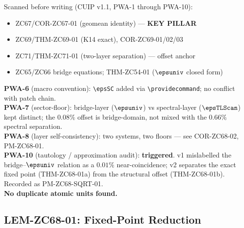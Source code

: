 \documentclass[12pt, a4paper]{article}
\begin{document}
\begin{formalbox}[title={Pre-Work Audit Record --- ZC68 v2}]
Scanned before writing (CUIP v1.1, PWA-1 through PWA-10):
\begin{itemize}[leftmargin=2em, noitemsep]
  \item ZC67/COR-ZC67-01 (geomean identity) --- \textbf{KEY PILLAR}
  \item ZC69/THM-ZC69-01 (K14 exact), COR-ZC69-01/02/03
  \item ZC71/THM-ZC71-01 (two-layer separation) --- offset anchor
  \item ZC65/ZC66 bridge equations; THM-ZC54-01 ($\epsuniv$ closed form)
\end{itemize}

\textbf{PWA-6} (macro convention): \texttt{\textbackslash epsSC} added via
\texttt{\textbackslash providecommand}; no conflict with patch chain.\\
\textbf{PWA-7} (sector-floor): bridge-layer ($\epsuniv$) vs spectral-layer
($\epsTLScan$) kept distinct; the $0.08\%$ offset is bridge-domain, not mixed
with the $0.66\%$ spectral separation.\\
\textbf{PWA-8} (layer self-consistency): two systems, two floors --- see
COR-ZC68-02, PM-ZC68-01.\\
\textbf{PWA-10} (tautology / approximation audit): \textbf{triggered}.
v1 mislabelled the bridge--$\epsuniv$ relation as a $0.01\%$ near-coincidence;
v2 separates the exact fixed point (THM-ZC68-01a) from the structural
offset (THM-ZC68-01b). Recorded as PM-ZC68-SQRT-01.\\
\textbf{No duplicate atomic units found.}
\end{formalbox}

\newpage

\subsection{LEM-ZC68-01: Fixed-Point Reduction}
\label{sec:lem}

\end{document}
